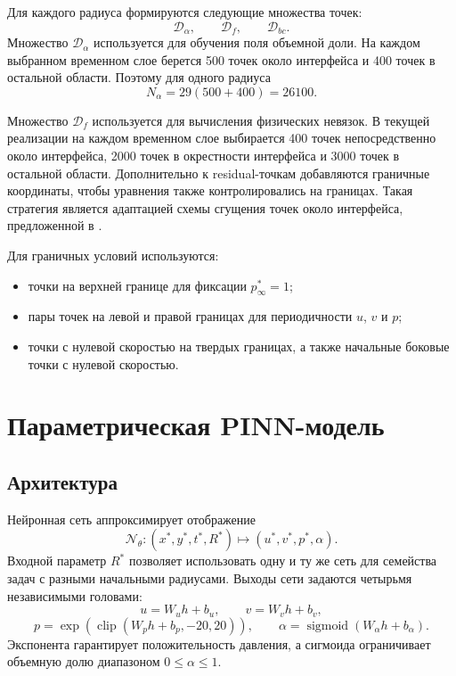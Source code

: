 \documentclass[12pt,a4paper]{article}
\begin{document}
Для каждого радиуса формируются следующие множества точек:
\[
    \mathcal{D}_\alpha,\qquad
    \mathcal{D}_f,\qquad
    \mathcal{D}_{bc}.
\]
Множество \(\mathcal{D}_\alpha\) используется для обучения поля объемной доли.
На каждом выбранном временном слое берется 500 точек около интерфейса и
400 точек в остальной области. Поэтому для одного радиуса
\[
    N_\alpha = 29(500+400)=26100.
\]

Множество \(\mathcal{D}_f\) используется для вычисления физических невязок.
В текущей реализации на каждом временном слое выбирается 400 точек
непосредственно около интерфейса, 2000 точек в окрестности интерфейса и
3000 точек в остальной области. Дополнительно к residual-точкам добавляются
граничные координаты, чтобы уравнения также контролировались на границах.
Такая стратегия является адаптацией схемы сгущения точек около интерфейса,
предложенной в \cite{Buhendwa2021}.

Для граничных условий используются:
\begin{itemize}
    \item точки на верхней границе для фиксации \(p_\infty^*=1\);
    \item пары точек на левой и правой границах для периодичности \(u\), \(v\)
    и \(p\);
    \item точки с нулевой скоростью на твердых границах, а также начальные
    боковые точки с нулевой скоростью.
\end{itemize}

\section{Параметрическая PINN-модель}

\subsection{Архитектура}

Нейронная сеть аппроксимирует отображение
\[
    \mathcal{N}_\theta:
    (x^*,y^*,t^*,R^*)\mapsto (u^*,v^*,p^*,\alpha).
\]
Входной параметр \(R^*\) позволяет использовать одну и ту же сеть для семейства
задач с разными начальными радиусами. Выходы сети задаются четырьмя независимыми
головами:
\[
    u = W_u h + b_u,
    \qquad
    v = W_v h + b_v,
\]
\[
    p = \exp\left(\operatorname{clip}(W_p h+b_p,-20,20)\right),
    \qquad
    \alpha=\operatorname{sigmoid}(W_\alpha h+b_\alpha).
\]
Экспонента гарантирует положительность давления, а сигмоида ограничивает
объемную долю диапазоном \(0\leq\alpha\leq1\).
\end{document}
